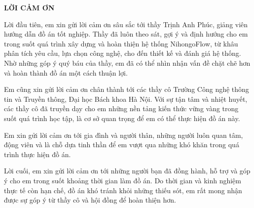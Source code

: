 \documentclass[../DoAn.tex]{subfiles}
\begin{document}
\begin{center}
    \Large{\textbf{LỜI CẢM ƠN}}\\
\end{center}
\vspace{1cm}
Lời đầu tiên, em xin gửi lời cảm ơn sâu sắc tới thầy Trịnh Anh Phúc, giảng viên hướng dẫn đồ án tốt nghiệp. Thầy đã luôn theo sát, gợi ý và định hướng cho em trong suốt quá trình xây dựng và hoàn thiện hệ thống NihongoFlow, từ khâu phân tích yêu cầu, lựa chọn công nghệ, cho đến thiết kế và đánh giá hệ thống. Nhờ những góp ý quý báu của thầy, em đã có thể nhìn nhận vấn đề chặt chẽ hơn và hoàn thành đồ án một cách thuận lợi.

Em cũng xin gửi lời cảm ơn chân thành tới các thầy cô Trường Công nghệ thông tin và Truyền thông, Đại học Bách khoa Hà Nội. Với sự tận tâm và nhiệt huyết, các thầy cô đã truyền dạy cho em những nền tảng kiến thức vững vàng trong suốt quá trình học tập, là cơ sở quan trọng để em có thể thực hiện đồ án này.

Em xin gửi lời cảm ơn tới gia đình và người thân, những người luôn quan tâm, động viên và là chỗ dựa tinh thần để em vượt qua những khó khăn trong quá trình thực hiện đồ án.

Lời cuối, em xin gửi lời cảm ơn tới những người bạn đã đồng hành, hỗ trợ và góp ý cho em trong suốt khoảng thời gian làm đồ án. Do thời gian và kinh nghiệm thực tế còn hạn chế, đồ án khó tránh khỏi những thiếu sót, em rất mong nhận được sự góp ý từ thầy cô và hội đồng để hoàn thiện hơn.
\end{document}
